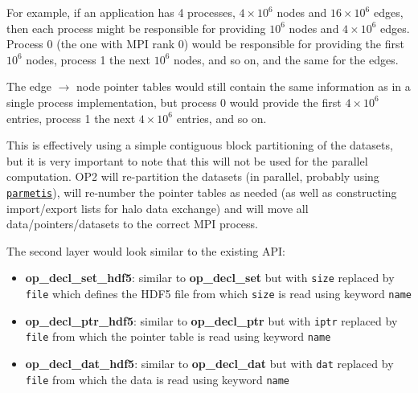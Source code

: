 \documentclass[11pt]{article}
\begin{document}
For example, if an application has 4 processes, $4\times 10^6$ nodes and 
$16 \times 10^6$ edges, then each process might be responsible for providing
$10^6$ nodes and $4\times 10^6$ edges. Process 0 (the one with MPI rank 0)
would be responsible for providing the first $10^6$ nodes, process 1 the 
next $10^6$ nodes, and so on, and the same for the edges.

The edge $\rightarrow$ node pointer tables would still contain the same 
information as in a single process implementation, but process 0 would provide
the first $4\times 10^6$ entries, process 1 the next $4\times 10^6$ entries, 
and so on.

This is effectively using a simple contiguous block partitioning of the datasets, 
but it is very important to note that this will not be used for the parallel 
computation.  OP2 will re-partition the datasets (in parallel, probably using 
\href{http://glaros.dtc.umn.edu/gkhome/metis/parmetis/overview}{\tt parmetis}), 
will re-number the pointer tables as needed (as well as constructing import/export 
lists for halo data exchange) and will move all data/pointers/datasets to the 
correct MPI process.

The second layer would look similar to the existing API:
\begin{itemize}
\item {\bf op\_decl\_set\_hdf5}: similar to {\bf op\_decl\_set} but with {\tt size} 
replaced by {\tt file} which defines the HDF5 file from which {\tt size} 
is read using keyword {\tt name}

\item {\bf op\_decl\_ptr\_hdf5}: similar to {\bf op\_decl\_ptr} but with {\tt iptr} 
replaced by {\tt file} from which the pointer table is read using keyword {\tt name}

\item {\bf op\_decl\_dat\_hdf5}: similar to {\bf op\_decl\_dat} but with {\tt dat} 
replaced by {\tt file} from which the data is read using keyword {\tt name}
\end{itemize}
\end{document}
